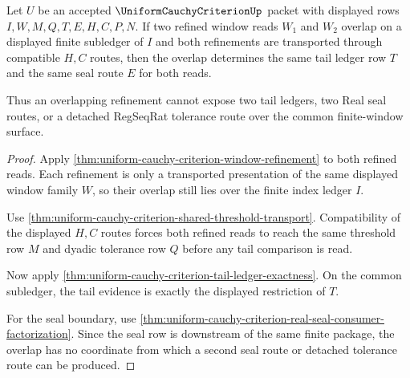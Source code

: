 \begin{theorem}
\label{thm:uniform-cauchy-criterion-overlap-refinement-determinacy}
Let $U$ be an accepted $\UniformCauchyCriterionUp$ packet with displayed rows $I,W,M,Q,T,E,H,C,P,N$. If two refined window reads $W_1$ and $W_2$ overlap on a displayed finite subledger of $I$ and both refinements are transported through compatible $H,C$ routes, then the overlap determines the same tail ledger row $T$ and the same seal route $E$ for both reads.

Thus an overlapping refinement cannot expose two tail ledgers, two Real seal routes, or a detached RegSeqRat tolerance route over the common finite-window surface.
\end{theorem}
\begin{proof}
Apply \autoref{thm:uniform-cauchy-criterion-window-refinement} to both refined reads. Each refinement is only a transported presentation of the same displayed window family $W$, so their overlap still lies over the finite index ledger $I$.

Use \autoref{thm:uniform-cauchy-criterion-shared-threshold-transport}. Compatibility of the displayed $H,C$ routes forces both refined reads to reach the same threshold row $M$ and dyadic tolerance row $Q$ before any tail comparison is read.

Now apply \autoref{thm:uniform-cauchy-criterion-tail-ledger-exactness}. On the common subledger, the tail evidence is exactly the displayed restriction of $T$.

For the seal boundary, use \autoref{thm:uniform-cauchy-criterion-real-seal-consumer-factorization}. Since the seal row is downstream of the same finite package, the overlap has no coordinate from which a second seal route or detached tolerance route can be produced.
\end{proof}

